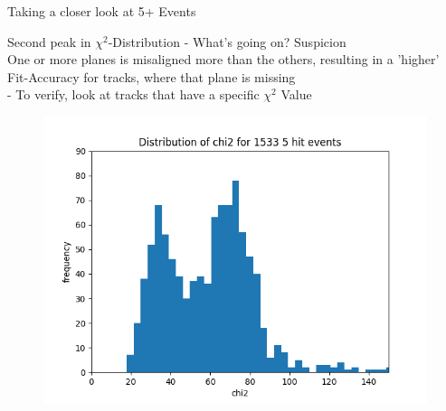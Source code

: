 \documentclass{beamer}
\begin{document}
\begin{frame}{Taking a closer look at 5+ Events}
\begin{minipage}{.4\textwidth}
    \end{minipage}
    \pause
\end{frame}

\begin{frame}{Second peak in \texorpdfstring{\( \chi ^2 \)}{}-Distribution
- What's going on?}
\LARGE Suspicion \\
\normalsize One or more planes is misaligned more than the others, resulting
in a 'higher' Fit-Accuracy for tracks, where that plane is missing \\[.5cm]
- To verify, look at tracks that have a specific \( \chi ^2 \) Value
\pause
\begin{minipage}{.3\textwidth}
    \begin{figure}[H]
	\centering
	\includegraphics[trim=80 0 160 50,clip,width=\textwidth]{567.png}
    \end{figure}
\end{minipage}
\begin{minipage}{.49\textwidth}
    \begin{figure}[H]
	\centering

\end{figure}
\end{minipage}
\end{frame}
\end{document}
